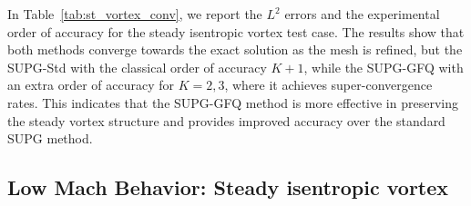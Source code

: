 \documentclass[a4paper,10pt]{article}
\renewcommand{\arraystretch}{0}  %
\begin{document}
In Table~\ref{tab:st_vortex_conv}, we report the $L^2$ errors and the experimental order of accuracy for the steady isentropic vortex test case. The results show that both methods converge towards the exact solution as the mesh is refined, but the SUPG-Std with the classical order of accuracy $K+1$, while the SUPG-GFQ with an extra order of accuracy for $K=2,3$, where it achieves super-convergence rates. 
This indicates that the SUPG-GFQ method is more effective in preserving the steady vortex structure and provides improved accuracy over the standard SUPG method.
\subsection{Low Mach Behavior: Steady isentropic vortex}
\renewcommand{\arraystretch}{0.93}
\setlength{\tabcolsep}{2pt}
\end{document}
